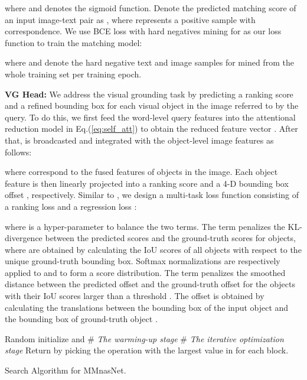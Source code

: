 \documentclass[sigconf]{acmart}
\begin{document}
where  and  denotes the sigmoid function. Denote the predicted matching score of an input image-text pair as , where  represents a positive sample with correspondence. We use BCE loss with hard negatives mining for  as our loss function to train the matching model:




where  and  denote the hard negative text and image samples for  mined from the whole training set per training epoch.

\noindent\textbf{VG Head:} We address the visual grounding task by predicting a ranking score and a refined bounding box for each visual object in the image referred to by the query. To do this, we first feed the word-level query features  into the attentional reduction model in Eq.(\ref{eq:self_att}) to obtain the reduced feature vector . After that,  is broadcasted and integrated with the object-level image features  as follows:

where  correspond to the fused features of  objects in the image. Each object feature  is then linearly projected into a ranking score  and a 4-D bounding box offset , respectively. Similar to \cite{yu2018rethinking}, we design a multi-task loss function consisting of a ranking loss  and a regression loss :

where  is a hyper-parameter to balance the two terms.
The  term penalizes the KL-divergence between the predicted scores  and the ground-truth scores  for  objects, where  are obtained by calculating the IoU scores of all objects with respect to the unique ground-truth bounding box. Softmax normalizations are respectively applied to  and  to form a score distribution.
The  term penalizes the smoothed  distance \cite{girshick2015fast} between the predicted offset  and the ground-truth offset  for the objects with their IoU scores  larger than a threshold . The offset  is obtained by calculating the translations between the bounding box of the input object and the bounding box of ground-truth object \cite{girshick2015fast}.

\begin{algorithm}
\footnotesize
\SetAlgoLined
{}
 Random initialize  and \;
\# \emph{The warming-up stage}\;
\# \emph{The iterative optimization stage}\;
{Return}  by picking the operation with the largest value in   for each block.
 \caption{Search Algorithm for MMnasNet.}\label{alg:1}
\end{algorithm}
\end{document}
